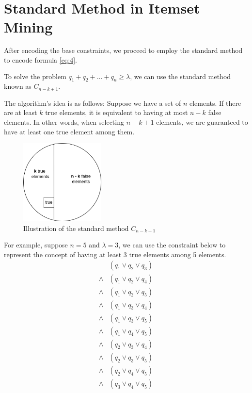 \section{Standard Method in Itemset Mining}

After encoding the base constraints,
we proceed to employ the standard method to encode formula \ref{eq:4}.

To solve the problem $q_1 + q_2 + ... + q_n \ge \lambda$, we can use the standard method known as $C_{n-k+1}$.

The algorithm's idea is as follows: Suppose we have a set of $n$ elements.
If there are at least $k$ true elements, it is equivalent to having at most $n-k$ false elements.
In other words, when selecting $n-k+1$ elements, we are guaranteed to have at least one true element among them.

\begin{figure}[H]
    \centering
    \includegraphics[width=0.38\textwidth]{chapter2/image/standard.png}
    \caption{Illustration of the standard method $C_{n-k+1}$}
    \label{fig:2_1}
\end{figure}

For example, suppose $n = 5$ and $\lambda = 3$, we can use the constraint below to represent the concept of having at least 3 true elements among 5 elements.
\begin{equation}
    \label{eq:5}
    \begin{aligned}
               & (q_1 \vee q_2 \vee q_3) \\
        \wedge & (q_1 \vee q_2 \vee q_4) \\
        \wedge & (q_1 \vee q_2 \vee q_5) \\
        \wedge & (q_1 \vee q_3 \vee q_4) \\
        \wedge & (q_1 \vee q_3 \vee q_5) \\
        \wedge & (q_1 \vee q_4 \vee q_5) \\
        \wedge & (q_2 \vee q_3 \vee q_4) \\
        \wedge & (q_2 \vee q_3 \vee q_5) \\
        \wedge & (q_2 \vee q_4 \vee q_5) \\
        \wedge & (q_3 \vee q_4 \vee q_5) \\
    \end{aligned}
\end{equation}

